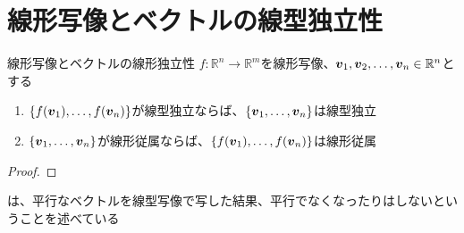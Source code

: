 \documentclass[../../../topic_linear-map-image-kernel]{subfiles}
\begin{document}
\sectionline
\section{線形写像とベクトルの線型独立性}

\begin{theorem}{線形写像とベクトルの線形独立性}
  $f\colon \mathbb{R}^n \to \mathbb{R}^m$を線形写像、$\vb*{v}_1, \vb*{v}_2, \dots, \vb*{v}_n \in \mathbb{R}^n$とする
  \begin{enumerate}[label=\romanlabel]
    \item $\{ f(\vb*{v}_1), \dots, f(\vb*{v}_n) \}$が線型独立ならば、$\{ \vb*{v}_1, \dots, \vb*{v}_n \}$は線型独立
    \item $\{\vb*{v}_1, \dots, \vb*{v}_n\}$が線形従属ならば、$\{ f(\vb*{v}_1),  \dots, f(\vb*{v}_n) \}$は線形従属
  \end{enumerate}
\end{theorem}

\begin{proof}
\end{proof}

は、平行なベクトルを線型写像で写した結果、平行でなくなったりはしないということを述べている

\sectionline
\end{document}
